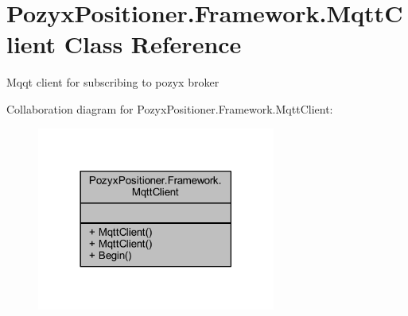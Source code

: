 \hypertarget{class_pozyx_positioner_1_1_framework_1_1_mqtt_client}{}\section{Pozyx\+Positioner.\+Framework.\+Mqtt\+Client Class Reference}
\label{class_pozyx_positioner_1_1_framework_1_1_mqtt_client}


Mqqt client for subscribing to pozyx broker  




Collaboration diagram for Pozyx\+Positioner.\+Framework.\+Mqtt\+Client\+:\nopagebreak
\begin{figure}[H]
\begin{center}
\leavevmode
\includegraphics[width=222pt]{class_pozyx_positioner_1_1_framework_1_1_mqtt_client__coll__graph}
\end{center}
\end{figure}
